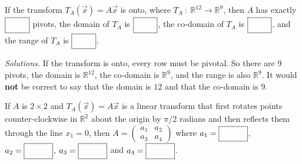 \ifnum {}
        If the transform $T_A(\vec x) = A\vec x$ is onto, where $T_A \ : \ \mathbb R^{12} \to \mathbb R^9$, then $A$ has exactly $\framebox{\strut\hspace{0.80cm}}$ pivots, the domain of $T_A$ is $\framebox{\strut\hspace{0.80cm}}$, the co-domain of $T_A$ is $\framebox{\strut\hspace{0.80cm}}$, and the range of $T_A$ is $\framebox{\strut\hspace{0.80cm}}$. 
        
        \ifnum {} {\color{DarkBlue} \textit{Solutions.} 
        If the transform is onto, every row must be pivotal. So there are 9 pivots, the domain is $\mathbb R^{12}$, the co-domain is $\mathbb R^9$, and the range is also $\mathbb R^9$. It would \textbf{not} be correct to say that the domain is $12$ and that the co-domain is $9$. 
        } 
       \fi      
\fi 

\ifnum {}
    If $A$ is $2 \times 2$ and $T_A(\vec x)=A\vec x$ is a linear transform that first rotates points counter-clockwise in $\mathbb R^2$ about the origin by $\pi/2$ radians and then reflects them through the line $x_1 = 0$, then $A=\begin{pmatrix} a_1 & a_2 \\ a_3 & a_4 \end{pmatrix} $ where $a_1 = \framebox{\strut\hspace{1.0cm}}$, $a_2 = \framebox{\strut\hspace{1.0cm}}$, $a_3 = \framebox{\strut\hspace{1.0cm}}$ and $a_4 = \framebox{\strut\hspace{1.0cm}}$.
    
